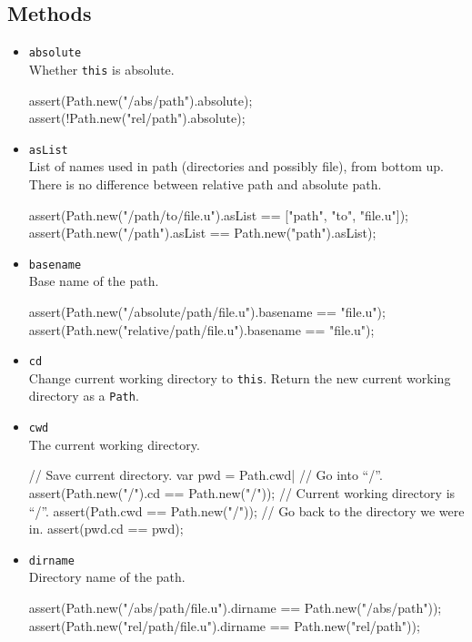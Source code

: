 \subsection{Methods}
\begin{itemize}
\item \lstinline|absolute|\\
  Whether \lstinline|this| is absolute.
\begin{urbiscript}[firstnumber=last]
assert(Path.new("/abs/path").absolute);
assert(!Path.new("rel/path").absolute);
\end{urbiscript}

\item \lstinline|asList|\\
  List of names used in path (directories and possibly file), from
  bottom up. There is no difference between relative path and absolute
  path.
\begin{urbiscript}[firstnumber=last]
assert(Path.new("/path/to/file.u").asList == ["path", "to", "file.u"]);
assert(Path.new("/path").asList           == Path.new("path").asList);
\end{urbiscript}

\item \lstinline|basename|\\
  Base name of the path.
\begin{urbiscript}[firstnumber=last]
assert(Path.new("/absolute/path/file.u").basename == "file.u");
assert(Path.new("relative/path/file.u").basename  == "file.u");
\end{urbiscript}

\item \lstinline|cd|\\
  Change current working directory to \lstinline|this|. Return the new
  current working directory as a \lstinline|Path|.

\item \lstinline|cwd|\\
  The current working directory.
\begin{urbiscript}[firstnumber=last]
// Save current directory.
var pwd = Path.cwd|
// Go into ``/''.
assert(Path.new("/").cd == Path.new("/"));
// Current working directory is ``/''.
assert(Path.cwd         == Path.new("/"));
// Go back to the directory we were in.
assert(pwd.cd           == pwd);
\end{urbiscript}

\item \lstinline|dirname|\\
  Directory name of the path.
\begin{urbiscript}[firstnumber=last]
assert(Path.new("/abs/path/file.u").dirname == Path.new("/abs/path"));
assert(Path.new("rel/path/file.u").dirname  == Path.new("rel/path"));
\end{urbiscript}


\end{itemize}
